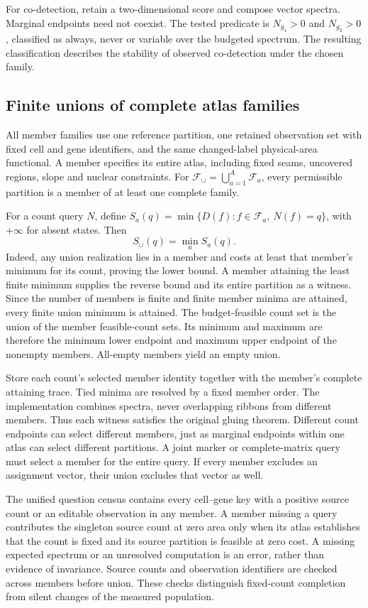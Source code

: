 \documentclass[10pt,letterpaper]{article}
\begin{document}
For co-detection, retain a two-dimensional score and compose vector spectra. Marginal endpoints need not coexist. The tested predicate is $N_{g_1}>0$ and $N_{g_2}>0$, classified as always, never or variable over the budgeted spectrum. The resulting classification describes the stability of observed co-detection under the chosen family.

\subsection{Finite unions of complete atlas families}\label{sec:union}
All member families use one reference partition, one retained observation set with fixed cell and gene identifiers, and the same changed-label physical-area functional. A member specifies its entire atlas, including fixed seams, uncovered regions, slope and nuclear constraints. For $\mathcal F_\cup=\bigcup_{a=1}^A\mathcal F_a$, every permissible partition is a member of at least one complete family.

For a count query $N$, define $S_a(q)=\min\{D(f):f\in\mathcal F_a,\ N(f)=q\}$, with $+\infty$ for absent states. Then
\[
 S_\cup(q)=\min_a S_a(q).
\]
Indeed, any union realization lies in a member and costs at least that member's minimum for its count, proving the lower bound. A member attaining the least finite minimum supplies the reverse bound and its entire partition as a witness. Since the number of members is finite and finite member minima are attained, every finite union minimum is attained. The budget-feasible count set is the union of the member feasible-count sets. Its minimum and maximum are therefore the minimum lower endpoint and maximum upper endpoint of the nonempty members. All-empty members yield an empty union.

Store each count's selected member identity together with the member's complete attaining trace. Tied minima are resolved by a fixed member order. The implementation combines spectra, never overlapping ribbons from different members. Thus each witness satisfies the original gluing theorem. Different count endpoints can select different members, just as marginal endpoints within one atlas can select different partitions. A joint marker or complete-matrix query must select a member for the entire query. If every member excludes an assignment vector, their union excludes that vector as well.

The unified question census contains every cell--gene key with a positive source count or an editable observation in any member. A member missing a query contributes the singleton source count at zero area only when its atlas establishes that the count is fixed and its source partition is feasible at zero cost. A missing expected spectrum or an unresolved computation is an error, rather than evidence of invariance. Source counts and observation identifiers are checked across members before union. These checks distinguish fixed-count completion from silent changes of the measured population.
\end{document}
